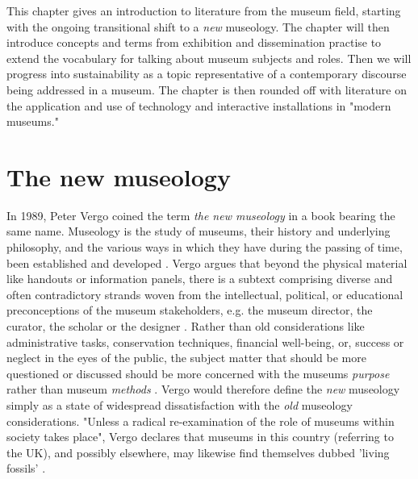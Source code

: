 This chapter gives an introduction to literature from the museum field, starting with the ongoing transitional shift to a \emph{new} museology. The chapter will then introduce concepts and terms from exhibition and dissemination practise to extend the vocabulary for talking about museum subjects and roles. Then we will progress into sustainability as a topic representative of a contemporary discourse being addressed in a museum. The chapter is then rounded off with literature on the application and use of technology and interactive installations in "modern museums."


\section{The new museology}
In 1989, Peter Vergo coined the term \emph{the new museology} in a book bearing the same name. Museology is the study of museums, their history and underlying philosophy, and the various ways in which they have during the passing of time, been established and developed \autocite[p.1]{vergo_museology_1989}. Vergo argues that beyond the physical material like handouts or information panels, there is a subtext comprising diverse and often contradictory strands woven from the intellectual, political, or educational preconceptions of the museum stakeholders, e.g. the museum director, the curator, the scholar or the designer \autocite[p.3]{vergo_museology_1989}. Rather than old considerations like administrative tasks, conservation techniques, financial well-being, or, success or neglect in the eyes of the public, the subject matter that should be more questioned or discussed should be more concerned with the museums \emph{purpose} rather than museum \emph{methods} \autocite[p.3]{vergo_museology_1989}. Vergo would therefore define the \emph{new} museology simply as a state of widespread dissatisfaction with the \emph{old} museology considerations. "Unless a radical re-examination of the role of museums within society takes place", Vergo declares that museums in this country (referring to the UK), and possibly elsewhere, may likewise find themselves dubbed 'living fossils' \autocite[p.4]{vergo_museology_1989}.


